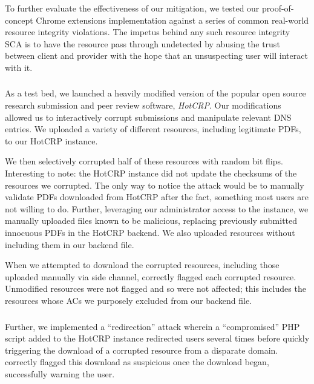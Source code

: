 To further evaluate the effectiveness of our mitigation, we tested our
proof-of-concept \SYSTEM{} Chrome extensions implementation against a series of
common real-world resource integrity violations. The impetus behind any such
resource integrity SCA is to have the resource pass through undetected by
abusing the trust between client and provider with the hope that an unsuspecting
user will interact with it.

\subsubsection{\DNSSYS{}}

As a test bed, we launched a heavily modified version of the popular open source
research submission and peer review software, \emph{HotCRP}. Our modifications
allowed us to interactively corrupt submissions and manipulate relevant DNS
entries. We uploaded a variety of different resources, including legitimate
PDFs, to our HotCRP instance.

We then selectively corrupted half of these resources with random bit flips.
Interesting to note: the HotCRP instance did not update the checksums of the
resources we corrupted. The only way to notice the attack would be to manually
validate PDFs downloaded from HotCRP after the fact, something most users are
not willing to do. Further, leveraging our administrator access to the instance,
we manually uploaded files known to be malicious, replacing previously submitted
innocuous PDFs in the HotCRP backend. We also uploaded resources without
including them in our backend file.

When we attempted to download the corrupted resources, including those uploaded
manually via side channel, \SYSTEM{} correctly flagged each corrupted resource.
Unmodified resources were not flagged and so were not affected; this includes
the resources whose ACs we purposely excluded from our backend file.

\subsubsection{\DHTSYS{}}

Further, we implemented a ``redirection'' attack wherein a ``compromised'' PHP
script added to the HotCRP instance redirected users several times before
quickly triggering the download of a corrupted resource from a disparate domain.
\SYSTEM{} correctly flagged this download as suspicious once the download began,
successfully warning the user.

